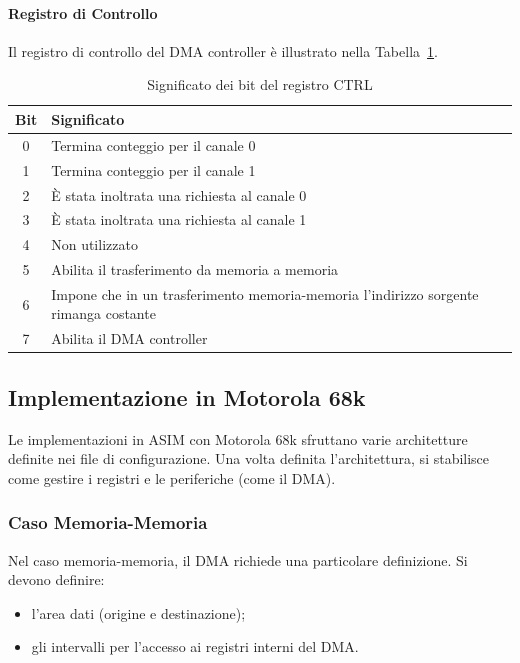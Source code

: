 \paragraph{Registro di Controllo}
Il registro di controllo del DMA controller è illustrato nella Tabella~\ref{tab:CTRL-8237}.
\begin{table}[ht]
    \centering
    \begin{tabular}{|c|p{11cm}|}
    \hline
    \textbf{Bit} & \textbf{Significato} \\ \hline
    0 & Termina conteggio per il canale 0 \\ \hline
    1 & Termina conteggio per il canale 1 \\ \hline
    2 & È stata inoltrata una richiesta al canale 0 \\ \hline
    3 & È stata inoltrata una richiesta al canale 1 \\ \hline
    4 & Non utilizzato \\ \hline
    5 & Abilita il trasferimento da memoria a memoria \\ \hline
    6 & Impone che in un trasferimento memoria-memoria l'indirizzo sorgente rimanga costante \\ \hline
    7 & Abilita il DMA controller \\ \hline
    \end{tabular}
    \caption{Significato dei bit del registro CTRL}
    \label{tab:CTRL-8237}
\end{table}

\newpage

\subsection{Implementazione in Motorola 68k}

Le implementazioni in ASIM con Motorola 68k sfruttano varie architetture definite nei file di configurazione. Una volta definita l'architettura, si stabilisce come gestire i registri e le periferiche (come il DMA). 

\subsubsection{Caso Memoria-Memoria}

Nel caso memoria-memoria, il DMA richiede una particolare definizione. Si devono definire:
\begin{itemize}
    \item l'area dati (origine e destinazione);
    \item gli intervalli per l'accesso ai registri interni del DMA.
\end{itemize}

